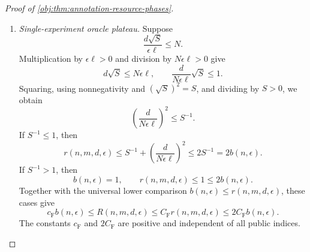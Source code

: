 \documentclass[11pt]{article}
\begin{document}
\begin{proof}[Proof of \cref{obj:thm:annotation-resource-phases}]
\begin{enumerate}
\item \emph{Single-experiment oracle plateau.}
Suppose
\[
\frac{d\sqrt S}{\epsilon\ell}\le N.
\]
Multiplication by \(\epsilon\ell>0\) and division by
\(N\epsilon\ell>0\) give
\[
d\sqrt S\le N\epsilon\ell,
\qquad
\frac{d}{N\epsilon\ell}\sqrt S\le1.
\]
Squaring, using nonnegativity and \((\sqrt S)^2=S\), and dividing by \(S>0\), we obtain
\[
\left(\frac{d}{N\epsilon\ell}\right)^2\le S^{-1}.
\]
If \(S^{-1}\le1\), then
\[
r(n,m,d,\epsilon)
\le S^{-1}+\left(\frac{d}{N\epsilon\ell}\right)^2
\le2S^{-1}
=2b(n,\epsilon).
\]
If \(S^{-1}>1\), then
\[
b(n,\epsilon)=1,\qquad
r(n,m,d,\epsilon)\le1\le2b(n,\epsilon).
\]
Together with the universal lower comparison
\(b(n,\epsilon)\le r(n,m,d,\epsilon)\), these cases give
\[
c_{\mathrm F}b(n,\epsilon)
\le R(n,m,d,\epsilon)
\le C_{\mathrm F}r(n,m,d,\epsilon)
\le2C_{\mathrm F}b(n,\epsilon).
\]
The constants \(c_{\mathrm F}\) and \(2C_{\mathrm F}\) are positive and independent of all public indices.
\end{enumerate}
\end{proof}




\end{document}
